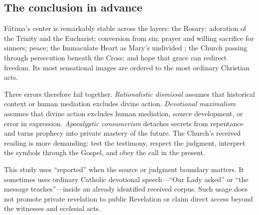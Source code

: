 \subsection{The conclusion in advance}

Fátima's center is remarkably stable across the layers: the Rosary; adoration of the Trinity and the Eucharist; conversion from sin; prayer and willing sacrifice for sinners; peace; the Immaculate Heart as Mary's undivided ; the Church passing through persecution beneath the Cross; and hope that grace can redirect freedom. Its most sensational images are ordered to the most ordinary Christian acts.

Three errors therefore fail together. \emph{Rationalistic dismissal} assumes that historical context or human mediation excludes divine action. \emph{Devotional maximalism} assumes that divine action excludes human mediation, source development, or error in expression. \emph{Apocalyptic consumerism} detaches secrets from repentance and turns prophecy into private mastery of the future. The Church's received reading is more demanding: test the testimony, respect the judgment, interpret the symbols through the Gospel, and obey the call in the present.

This study uses “reported” when the source or judgment boundary matters. It sometimes uses ordinary Catholic devotional speech---“Our Lady asked” or “the message teaches”---inside an already identified received corpus. Such usage does not promote private revelation to public Revelation or claim direct access beyond the witnesses and ecclesial acts.
